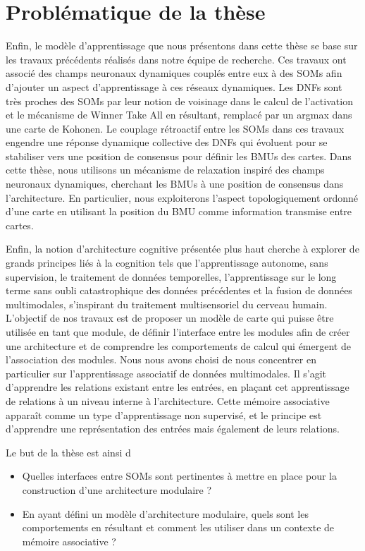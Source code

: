 \section*{Problématique de la thèse}

Enfin, le modèle d'apprentissage que nous présentons dans cette thèse se base sur les travaux précédents réalisés dans notre équipe de recherche. Ces travaux ont associé des champs neuronaux dynamiques couplés entre eux à des SOMs afin d'ajouter un aspect d'apprentissage à ces réseaux dynamiques.
Les DNFs sont très proches des SOMs par leur notion de voisinage dans le calcul de l'activation et le mécanisme de Winner Take All en résultant, remplacé par un argmax dans une carte de Kohonen. Le couplage rétroactif entre les SOMs dans ces travaux engendre une réponse dynamique collective des DNFs qui évoluent pour se stabiliser vers une position de consensus pour définir les BMUs des cartes.
Dans cette thèse, nous utilisons un mécanisme de relaxation inspiré des champs neuronaux dynamiques, cherchant les BMUs à une position de consensus dans l'architecture.
En particulier, nous exploiterons l'aspect topologiquement ordonné d'une carte en utilisant la position du BMU comme information transmise entre cartes. 

Enfin, la notion d'architecture cognitive présentée plus haut cherche à explorer de grands principes liés à la cognition tels que l'apprentissage autonome, sans supervision, le traitement de données temporelles, l'apprentissage sur le long terme sans oubli catastrophique des données précédentes et la fusion de données multimodales, s'inspirant du traitement multisensoriel du cerveau humain.
L'objectif de nos travaux est de proposer un modèle de carte qui puisse être utilisée en tant que module, de définir l'interface entre les modules afin de créer une architecture et de comprendre les comportements de calcul qui émergent de l'association des modules. 
Nous nous avons choisi de nous concentrer en particulier sur l'apprentissage associatif de données multimodales. Il s'agit d'apprendre les relations existant entre les entrées, en plaçant cet apprentissage de relations à un niveau interne à l'architecture.
Cette mémoire associative apparaît comme un type d'apprentissage non supervisé, et le principe est d'apprendre une représentation des entrées mais également de leurs relations.



Le but de la thèse est ainsi d
\begin{itemize}
    \item Quelles interfaces entre SOMs sont pertinentes à mettre en place pour la construction d'une architecture modulaire ?
    \item En ayant défini un modèle d'architecture modulaire, quels sont les comportements en résultant et comment les utiliser dans un contexte de mémoire associative ?
\end{itemize}

